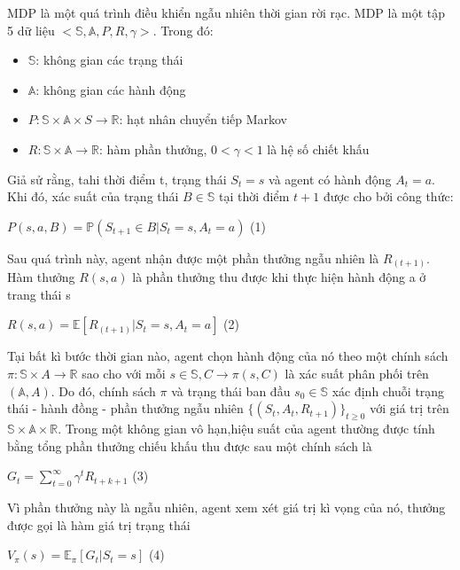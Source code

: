 \documentclass[14pt]{extreport}
\begin{document}
MDP là một quá trình điều khiển ngẫu nhiên thời gian rời rạc. MDP là một tập 5 dữ liệu $<\mathbb{S},\mathbb{A},P,R,\gamma>$. Trong đó:

\begin{itemize}
 \item  $\mathbb{S}$: không gian các trạng thái
 \item $\mathbb{A}$: không gian các hành động
 \item  $P: \mathbb{S} \times\mathbb{A} \times S\rightarrow \mathbb{R}$: hạt nhân chuyển tiếp Markov
 \item $R: \mathbb{S} \times \mathbb{A}\rightarrow \mathbb{R}$: hàm phần thưởng, $0<\gamma<1$ là hệ số chiết khấu
\end{itemize}
 Giả sử rằng, tahi thời điểm t, trạng thái $S_t=s$ và agent có hành động $A_t=a$. Khi đó, xác suất của trạng thái $B \in \mathbb{S}$ tại thời điểm $t+1$ được cho bởi công thức:
 
 \begin{center}
 $P(s,a,B)=\mathbb{P} (S_{t+1} \in B|S_t=s,A_t=a)$       (1)
 \end{center}
 
 Sau quá trình này, agent nhận được một phần thưởng ngẫu nhiên là $R_(t+1)$. Hàm thưởng $R(s,a)$ là phần thưởng thu được khi thực hiện hành động a ở trang thái s
 
 \begin{center}
 $R(s,a)=\mathbb{E}[R_(t+1)|S_t=s,A_t=a]$         (2)
 \end{center}
 
 Tại bất kì bước thời gian nào, agent chọn hành động của nó theo một chính sách $\pi: \mathbb{S} \times A \rightarrow \mathbb{R}$ sao cho với mỗi $s \in \mathbb{S},C \rightarrow \pi(s,C)$ là  xác suất phân phối trên $(\mathbb{A},A)$. Do đó, chính sách $\pi$ và trạng thái ban đầu $s_0 \in \mathbb{S}$ xác định chuỗi trạng thái - hành đồng - phần thưởng ngẫu nhiên $\{(S_t,A_t,R_{t+1})\}_{t \geq 0}$ với giá trị trên $\mathbb{S} \times \mathbb{A} \times \mathbb{R}$. Trong một không gian vô hạn,hiệu suất của agent thường được tính bằng tổng phần thưởng chiếu khấu thu được sau một chính sách là
 
 \begin{center}
 $G_t=\sum_{t=0}^ {\infty} \gamma ^t R_{t+k+1}$     (3)
 \end{center}
 
 Vì phần thưởng này là ngẫu nhiên, agent xem xét giá trị kì vọng của nó, thưởng được gọi là hàm giá trị trạng thái
 
 \begin{center}
 $V_ \pi (s)=\mathbb{E}_ \pi [G_t|S_t=s]$         (4) 
 \end{center}
 
\end{document}
